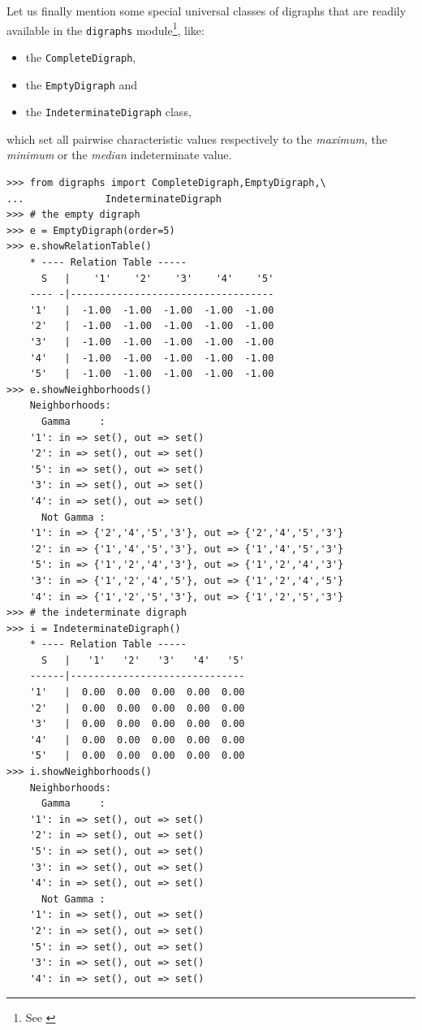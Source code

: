 Let us finally mention some special universal classes of digraphs that are readily available in the \texttt{digraphs} module\footnote{See \citealp{BIS-2021}}, like:
\begin{itemize}[nosep]
\item the \texttt{CompleteDigraph},
\item  the \texttt{EmptyDigraph} and
\item  the \texttt{IndeterminateDigraph} class,
\end{itemize}
which set all pairwise characteristic values respectively to the \emph{maximum}, the \emph{minimum} or the \emph{median} indeterminate value.
\begin{lstlisting}[caption={Complete, empty and indeterminate digraphs},label=list:2.11]
>>> from digraphs import CompleteDigraph,EmptyDigraph,\
...   			 IndeterminateDigraph
>>> # the empty digraph   
>>> e = EmptyDigraph(order=5)
>>> e.showRelationTable()
    * ---- Relation Table -----
      S   |    '1'    '2'    '3'    '4'	   '5'	  
    ---- -|-----------------------------------
    '1'   |  -1.00  -1.00  -1.00  -1.00	 -1.00	 
    '2'   |  -1.00  -1.00  -1.00  -1.00	 -1.00	 
    '3'   |  -1.00  -1.00  -1.00  -1.00	 -1.00	 
    '4'   |  -1.00  -1.00  -1.00  -1.00	 -1.00	 
    '5'   |  -1.00  -1.00  -1.00  -1.00	 -1.00
>>> e.showNeighborhoods() 
    Neighborhoods:
      Gamma     :
    '1': in => set(), out => set()
    '2': in => set(), out => set()
    '5': in => set(), out => set()
    '3': in => set(), out => set()
    '4': in => set(), out => set()
      Not Gamma :
    '1': in => {'2','4','5','3'}, out => {'2','4','5','3'}
    '2': in => {'1','4','5','3'}, out => {'1','4','5','3'}
    '5': in => {'1','2','4','3'}, out => {'1','2','4','3'}
    '3': in => {'1','2','4','5'}, out => {'1','2','4','5'}
    '4': in => {'1','2','5','3'}, out => {'1','2','5','3'}
>>> # the indeterminate digraph
>>> i = IndeterminateDigraph()
    * ---- Relation Table -----
      S   |   '1'   '2'	  '3'	'4'   '5'	  
    ------|------------------------------
    '1'   |  0.00  0.00	 0.00  0.00  0.00	 
    '2'   |  0.00  0.00	 0.00  0.00  0.00	 
    '3'   |  0.00  0.00	 0.00  0.00  0.00	 
    '4'   |  0.00  0.00	 0.00  0.00  0.00	 
    '5'   |  0.00  0.00	 0.00  0.00  0.00	 
>>> i.showNeighborhoods()
    Neighborhoods:
      Gamma     :
    '1': in => set(), out => set()
    '2': in => set(), out => set()
    '5': in => set(), out => set()
    '3': in => set(), out => set()
    '4': in => set(), out => set()
      Not Gamma :
    '1': in => set(), out => set()
    '2': in => set(), out => set()
    '5': in => set(), out => set()
    '3': in => set(), out => set()
    '4': in => set(), out => set()
\end{lstlisting}

